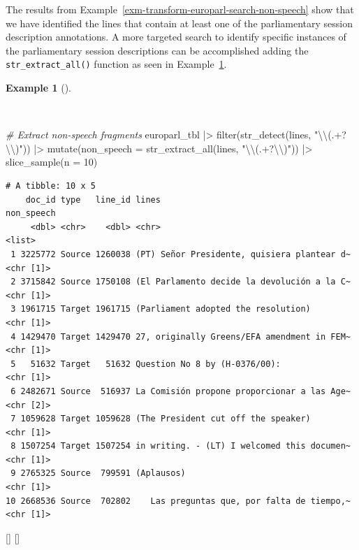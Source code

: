 \documentclass[
  letterpaper,
  krantz1]{latex/krantz-mod}
\newenvironment{Shaded}{\begin{snugshade}}{\end{snugshade}}
\newcommand{\AttributeTok}[1]{\textcolor[rgb]{0.00,0.00,0.00}{#1}}
\newcommand{\CommentTok}[1]{\textcolor[rgb]{0.00,0.00,0.00}{\textit{#1}}}
\newcommand{\DecValTok}[1]{\textcolor[rgb]{0.00,0.00,0.00}{#1}}
\newcommand{\FunctionTok}[1]{\textcolor[rgb]{0.00,0.00,0.00}{#1}}
\newcommand{\NormalTok}[1]{\textcolor[rgb]{0.00,0.00,0.00}{#1}}
\newcommand{\SpecialCharTok}[1]{\textcolor[rgb]{0.00,0.00,0.00}{#1}}
\newcommand{\StringTok}[1]{\textcolor[rgb]{0.00,0.00,0.00}{#1}}
\newcommand{\cindex}[1]{%
  \StrSubstitute{#1}{_}{\_}[\temp]%
  \index{\temp}%
}
\theoremstyle{definition}
\theoremstyle{definition}
\newtheorem{example}{Example}[chapter]
\theoremstyle{remark}
\begin{document}
The results from Example~\ref{exm-transform-europarl-search-non-speech}
show that we have identified the lines that contain at least one of the
parliamentary session description annotations. A more targeted search to
identify specific instances of the parliamentary session descriptions
can be accomplished adding the \texttt{str\_extract\_all()} function as
seen in Example~\ref{exm-transform-europarl-search-non-speech-2}.

\begin{example}[]\protect\hypertarget{exm-transform-europarl-search-non-speech-2}{}\label{exm-transform-europarl-search-non-speech-2}

~

\begin{Shaded}
\begin{Highlighting}[numbers=left,,]
\CommentTok{\# Extract non{-}speech fragments}
\NormalTok{europarl\_tbl }\SpecialCharTok{|\textgreater{}}
  \FunctionTok{filter}\NormalTok{(}\FunctionTok{str\_detect}\NormalTok{(lines, }\StringTok{"}\SpecialCharTok{\textbackslash{}\textbackslash{}}\StringTok{(.+?}\SpecialCharTok{\textbackslash{}\textbackslash{}}\StringTok{)"}\NormalTok{)) }\SpecialCharTok{|\textgreater{}}
  \FunctionTok{mutate}\NormalTok{(}\AttributeTok{non\_speech =} \FunctionTok{str\_extract\_all}\NormalTok{(lines, }\StringTok{"}\SpecialCharTok{\textbackslash{}\textbackslash{}}\StringTok{(.+?}\SpecialCharTok{\textbackslash{}\textbackslash{}}\StringTok{)"}\NormalTok{)) }\SpecialCharTok{|\textgreater{}}
  \FunctionTok{slice\_sample}\NormalTok{(}\AttributeTok{n =} \DecValTok{10}\NormalTok{)}
\end{Highlighting}
\end{Shaded}

\begin{verbatim}
# A tibble: 10 x 5
    doc_id type   line_id lines                                       non_speech
     <dbl> <chr>    <dbl> <chr>                                       <list>    
 1 3225772 Source 1260038 (PT) Señor Presidente, quisiera plantear d~ <chr [1]> 
 2 3715842 Source 1750108 (El Parlamento decide la devolución a la C~ <chr [1]> 
 3 1961715 Target 1961715 (Parliament adopted the resolution)         <chr [1]> 
 4 1429470 Target 1429470 27, originally Greens/EFA amendment in FEM~ <chr [1]> 
 5   51632 Target   51632 Question No 8 by (H-0376/00):               <chr [1]> 
 6 2482671 Source  516937 La Comisión propone proporcionar a las Age~ <chr [2]> 
 7 1059628 Target 1059628 (The President cut off the speaker)         <chr [1]> 
 8 1507254 Target 1507254 in writing. - (LT) I welcomed this documen~ <chr [1]> 
 9 2765325 Source  799591 (Aplausos)                                  <chr [1]> 
10 2668536 Source  702802    Las preguntas que, por falta de tiempo,~ <chr [1]> 
\end{verbatim}

\cindex{mutate()}\cindex{str_extract_all()}

\end{example}
\end{document}
